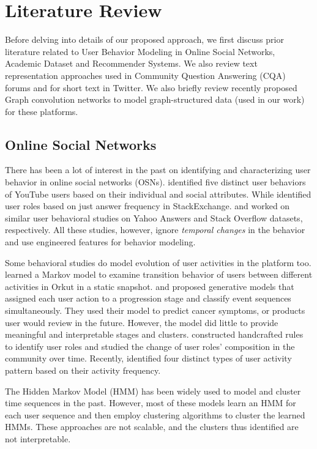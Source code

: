 \chapter{Literature Review}
\label{sec:related}

Before delving into details of our proposed approach, we first discuss prior literature related to User Behavior Modeling in Online Social Networks, Academic Dataset and Recommender Systems. We also review text representation approaches used in Community Question Answering (CQA) forums and for short text in Twitter. We also briefly review recently proposed Graph convolution networks to model graph-structured data (used in our work) for these platforms.

\section{Online Social Networks}
There has been a lot of interest in the past on identifying and characterizing user behavior in online social networks (OSNs). \citet{Maia:2008} identified five distinct user behaviors of YouTube users based on their individual and social attributes. While \citet{Mamykina:2011} identified user roles based on just answer frequency in StackExchange. \citet{Adamic:2008} and \citet{Furtado:2013} worked on similar user behavioral studies on Yahoo Answers and Stack Overflow datasets, respectively. All these studies, however, ignore \emph{temporal changes} in the behavior and use engineered features for behavior modeling.

Some behavioral studies do model evolution of user activities in the platform too. \citet{Benevenuto:2009} learned a Markov model to examine transition behavior of users between different activities in Orkut in a static snapshot. \citet{Yang:2014} and \citet{Knab2003} proposed generative models that assigned each user action to a progression stage and classify event sequences simultaneously. They used their model to predict cancer symptoms, or products user would review in the future. However, the model did little to provide meaningful and interpretable stages and clusters. \citet{Angeletou:2011} constructed handcrafted rules to identify user roles and studied the change of user roles' composition in the community over time. Recently, \citet{Santos:2019} identified four distinct types of user activity pattern based on their activity frequency.

The Hidden Markov Model (HMM) has been widely used to model and cluster time sequences \citep{Smyth:1997, Bicego:2003, Coviello:2014} in the past. However, most of these models learn an HMM for each user sequence and then employ clustering algorithms to cluster the learned HMMs. These approaches are not scalable, and the clusters thus identified are not interpretable.

